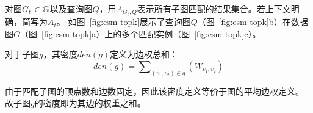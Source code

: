     对图$G_t$ $\in\mathbb{G}$以及查询图$Q$，用$A_{G_t,Q}$表示所有子图匹配的结果集合。若上下文明确，简写为$A_t$。
    如图~\ref{fig:csm-topk}展示了查询图$Q$（图~\ref{fig:csm-topk}b）在数据图$G$（图~\ref{fig:csm-topk}a）上的多个匹配实例（图~\ref{fig:csm-topk}c）。
    
    \begin{definition}[子图密度]\label{def:subgraph-density}

    对于子图$g$，其密度$den(g)$定义为边权总和：
    \begin{equation}\label{euq:dense_g}
        den(g) = \sum\nolimits_{(v_1,v_2)\in g}\left(W_{v_1,v_2}\right)
    \end{equation}
    
    由于匹配子图的顶点数和边数固定，因此该密度定义等价于图的平均边权定义。
    故子图$g$的密度即为其边的权重之和。
    \end{definition}
    
